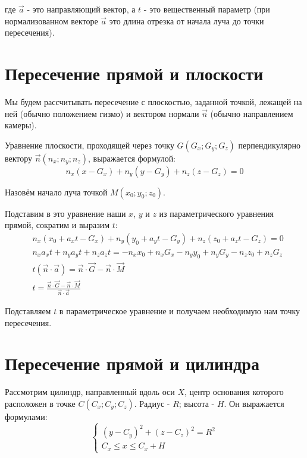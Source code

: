 \documentclass{article}
\begin{document}
	где $\vec{a}$ - это направляющий вектор, а $t$ - это вещественный параметр (при
	нормализованном векторе $\vec{a}$ это длина отрезка от начала луча до точки
	пересечения).
	\newpage
	\section{Пересечение прямой и плоскости}
	Мы будем рассчитывать пересечение с плоскостью, заданной точкой, лежащей на ней
	(обычно положением гизмо) и вектором нормали $\vec{n}$ (обычно направлением
	камеры).
	
	Уравнение плоскости, проходящей через точку $G(G_x;G_y;G_z)$ перпендикулярно
	вектору $\vec{n}(n_x;n_y;n_z)$, выражается формулой:
	\begin{equation}
		n_x(x-G_x)+n_y(y-G_y)+n_z(z-G_z)=0
	\end{equation}
	
	Назовём начало луча точкой $M(x_0;y_0;z_0)$.
	
	Подставим в это уравнение наши $x$, $y$ и $z$ из параметрического уравнения
	прямой, сократим и выразим $t$:
	\begin{equation}
		\begin{split}
			&n_x(x_0+a_xt-G_x)+n_y(y_0+a_yt-G_y)+n_z(z_0+a_zt-G_z)=0\\
			&n_xa_xt+n_ya_yt+n_za_zt=-n_xx_0+n_xG_x-n_yy_0+n_yG_y-n_zz_0+n_zG_z\\
			&t(\vec{n}\cdot\vec{a})=\vec{n}\cdot\vec{G}-\vec{n}\cdot\vec{M}\\
			&t=\frac{\vec{n}\cdot\vec{G}-\vec{n}\cdot\vec{M}}{\vec{n}\cdot\vec{a}}
		\end{split}
	\end{equation}
	
	Подставляем $t$ в параметрическое уравнение и получаем необходимую нам точку
	пересечения.
	\newpage
	\section{Пересечение прямой и цилиндра}
	Рассмотрим цилиндр, направленный вдоль оси $X$, центр основания которого
	расположен в точке $C(C_x;C_y;C_z)$. Радиус - $R$; высота - $H$. Он выражается
	формулами:
	\begin{equation}
		\begin{cases}
			(y-C_y)^2+(z-C_z)^2=R^2\\
			C_x\leq{}x\leq{}C_x+H
		\end{cases}
	\end{equation}
	
\end{document}
